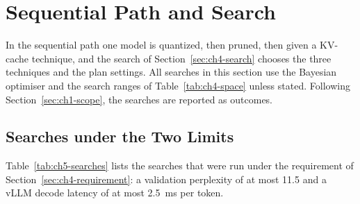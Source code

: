 \documentclass[
11pt, %
english, %
singlespacing, %
headsepline, %
]{MastersDoctoralThesis} %
\begin{document}
\section{Sequential Path and Search}
\label{sec:ch5-search}

In the sequential path one model is quantized, then pruned, then given a KV-cache technique, and the search of Section~\ref{sec:ch4-search} chooses the three techniques and the plan settings. All searches in this section use the Bayesian optimiser and the search ranges of Table~\ref{tab:ch4-space} unless stated. Following Section~\ref{sec:ch1-scope}, the searches are reported as outcomes.

\subsection{Searches under the Two Limits}

Table~\ref{tab:ch5-searches} lists the searches that were run under the requirement of Section~\ref{sec:ch4-requirement}: a validation perplexity of at most 11.5 and a vLLM decode latency of at most 2.5~ms per token.
\end{document}
